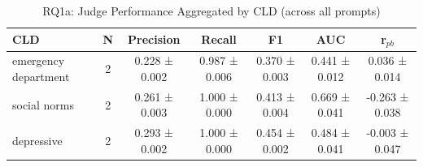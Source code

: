\begin{table}[htbp]
\centreing
\caption{RQ1a: Judge Performance Aggregated by CLD (across all prompts)}
\label{tab:rq1a_by_cld}
\begin{tabular}{lcccccc}
\toprule
\textbf{CLD} & \textbf{N} & \textbf{Precision} & \textbf{Recall} & \textbf{F1} & \textbf{AUC} & \textbf{r$_{pb}$} \\
\midrule
emergency department & 2 & 0.228 ± 0.002 & 0.987 ± 0.006 & 0.370 ± 0.003 & 0.441 ± 0.012 & 0.036 ± 0.014 \\
social norms & 2 & 0.261 ± 0.003 & 1.000 ± 0.000 & 0.413 ± 0.004 & 0.669 ± 0.041 & -0.263 ± 0.038 \\
depressive & 2 & 0.293 ± 0.002 & 1.000 ± 0.000 & 0.454 ± 0.002 & 0.484 ± 0.041 & -0.003 ± 0.047 \\
\bottomrule
\end{tabular}
\end{table}
